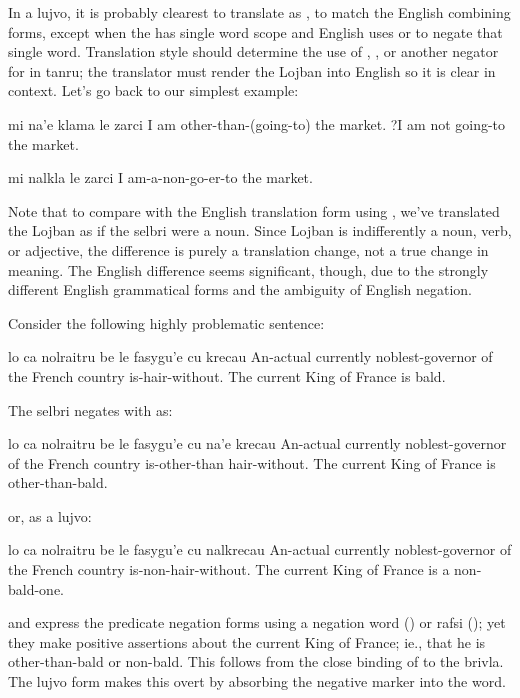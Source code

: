 In a lujvo, it is probably clearest to translate 
    as , to match the English combining forms, except when
    the  has single word scope and English uses  or
     to negate that single word. Translation style should
    determine the use of , , or another
    negator for  in tanru; the translator must render the
    Lojban into English so it is clear in context. Let's go back to
    our simplest example:
\begin{example}
mi na'e klama le zarci\n
I am other-than-(going-to) the market.\n
?I am not going-to the market.
\end{example}

\begin{example}
mi nalkla le zarci\n
I am-a-non-go-er-to the market.
\end{example}

Note that to compare with the English translation form using
    , we've translated the Lojban as if the selbri were a
    noun. Since Lojban  is indifferently a noun, verb, or
    adjective, the difference is purely a translation change, not a
    true change in meaning. The English difference seems
    significant, though, due to the strongly different English
    grammatical forms and the ambiguity of English negation.

Consider the following highly problematic sentence:
\begin{example}
lo ca nolraitru\n
\T	be le fasygu'e\n
\T	cu krecau\n
An-actual currently noblest-governor\n
\T	of the French country\n
\T	is-hair-without.\n
The current King of France is bald.
\end{example}

The selbri  negates with  as:
\begin{example}
lo ca nolraitru\n
\T	be le fasygu'e\n
\T	cu na'e krecau\n
An-actual currently noblest-governor\n
\T	of the French country\n
\T	is-other-than hair-without.\n
The current King of France is other-than-bald.
\end{example}

{\noindent}or, as a lujvo:
\begin{example}
lo ca nolraitru\n
\T	be le fasygu'e\n
\T	cu nalkrecau\n
An-actual currently noblest-governor\n
\T	of the French country\n
\T	is-non-hair-without.\n
The current King of France is a non-bald-one.
\end{example}

 and  express the predicate negation forms using a negation
    word () or rafsi (); yet they make positive
    assertions about the current King of France; ie., that he is
    other-than-bald or non-bald. This follows from the close
    binding of  to the brivla. The lujvo form makes this
    overt by absorbing the negative marker into the word. 

